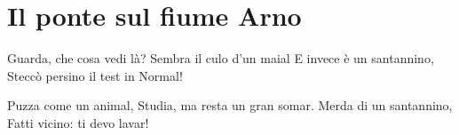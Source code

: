 \section{Il ponte sul fiume Arno}
\subtitle{Su “Colonel Bogey March” dal film “Il ponte sul fiume Kwai”}
\begin{canzone}
Guarda, che cosa vedi là?
Sembra il culo d’un maial
E invece è un santannino,
Steccò persino il test in Normal!

Puzza come un animal,
Studia, ma resta un gran somar.
Merda di un santannino,
Fatti vicino: ti devo lavar!
\end{canzone}
